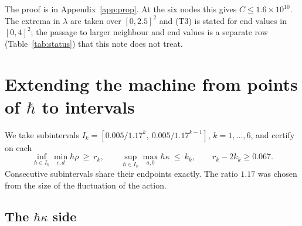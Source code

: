 \documentclass[11pt,a4paper]{article}
\theoremstyle{definition}
\theoremstyle{remark}
\newcommand{\hk}{\hbar\kappa}
\newcommand{\hr}{\hbar\rho}
\begin{document}
The proof is in Appendix~\ref{app:prop}. At the six nodes this gives $C\le1.6\times10^{10}$. The extrema in $\lambda$ are taken over $[0,2.5]^2$ and (T3) is stated for end values in $[0,4]^2$; the passage to larger neighbour and end values is a separate row (Table~\ref{tab:status}) that this note does not treat.

\section{Extending the machine from points of \texorpdfstring{$\hbar$}{hbar} to intervals}\label{sec:scheme}

We take subintervals $I_k=[0.005/1.17^k,\ 0.005/1.17^{k-1}]$, $k=1,\dots,6$, and certify on each
\[
\inf_{\hbar\in I_k}\min_{c,d}\hr\ \ge\ r_k,\qquad \sup_{\hbar\in I_k}\max_{a,b}\hk\ \le\ k_k,\qquad r_k-2k_k\ge0.067 .
\]
Consecutive subintervals share their endpoints exactly. The ratio $1.17$ was chosen from the size of the fluctuation of the action.

\subsection{The \texorpdfstring{$\hk$}{hbar kappa} side}\label{sec:hk}
\end{document}
